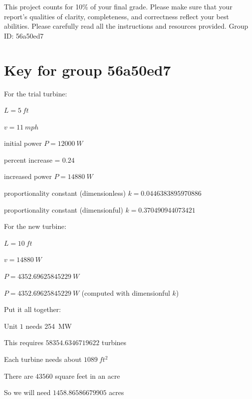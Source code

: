 \documentclass[11pt]{article}
\begin{document}
This project counts for 10\% of your final grade. Please make sure that
your report's qualities of clarity, completeness, and correctness
reflect your best abilities. Please carefully read all the instructions
and resources provided. \hfill Group ID: 56a50ed7


\newpage

\section*{Key for group 56a50ed7}

For the trial turbine:

\begin{compactenum}
    \item $L = \SI{5}{ft}$
    \item $v = \SI{11}{mph}$
    \item initial power $P = \SI{12000}{W}$
    \item percent increase = $0.24$
    \item increased power $P = \SI{14880}{W}$
    \item proportionality constant (dimensionless) $k = 0.0446383895970886$
    \item proportionality constant (dimensionful) $k = 0.370490944073421$
\end{compactenum}

For the new turbine:

\begin{compactenum}
    \item $L = \SI{10}{ft}$
    \item $v = \SI{14880}{W}$
    \item $P = \SI{4352.69625845229}{W}$
    \item $P = \SI{4352.69625845229}{W}$ (computed with dimensionful $k$)
\end{compactenum}

Put it all together:

\begin{compactenum}
    \item Unit $1$ needs \SI{254}{MW}
    \item This requires $58354.6346719622$ turbines
    \item Each turbine needs about $\SI{1089}{ft^2}$
    \item There are $43560$ square feet in an acre
    \item So we will need $1458.86586679905$ acres
\end{compactenum}

\end{document}
